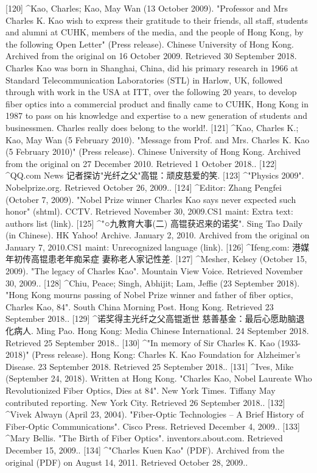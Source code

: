 [120]
^Kao, Charles; Kao, May Wan (13 October 2009). "Professor and Mrs Charles K. Kao wish to express their gratitude to their friends, all staff, students and alumni at CUHK, members of the media, and the people of Hong Kong, by the following Open Letter" (Press release). Chinese University of Hong Kong. Archived from the original on 16 October 2009. Retrieved 30 September 2018. Charles Kao was born in Shanghai, China, did his primary research in 1966 at Standard Telecommunication Laboratories (STL) in Harlow, UK, followed through with work in the USA at ITT, over the following 20 years, to develop fiber optics into a commercial product and finally came to CUHK, Hong Kong in 1987 to pass on his knowledge and expertise to a new generation of students and businessmen. Charles really does belong to the world!.
[121]
^Kao, Charles K.; Kao, May Wan (5 February 2010). "Message from Prof. and Mrs. Charles K. Kao (5 February 2010)" (Press release). Chinese University of Hong Kong. Archived from the original on 27 December 2010. Retrieved 1 October 2018..
[122]
^QQ.com News 记者探访"光纤之父"高锟：顽皮慈爱的笑.
[123]
^"Physics 2009". Nobelprize.org. Retrieved October 26, 2009..
[124]
^Editor: Zhang Pengfei (October 7, 2009). "Nobel Prize winner Charles Kao says never expected such honor" (shtml). CCTV. Retrieved November 30, 2009.CS1 maint: Extra text: authors list (link).
[125]
^"○九教育大事(二) 高锟获迟来的诺奖". Sing Tao Daily (in Chinese). HK Yahoo! Archive. January 2, 2010. Archived from the original on January 7, 2010.CS1 maint: Unrecognized language (link).
[126]
^Ifeng.com: 港媒年初传高锟患老年痴呆症 妻称老人家记性差.
[127]
^Mesher, Kelsey (October 15, 2009). "The legacy of Charles Kao". Mountain View Voice. Retrieved November 30, 2009..
[128]
^Chiu, Peace; Singh, Abhijit; Lam, Jeffie (23 September 2018). "Hong Kong mourns passing of Nobel Prize winner and father of fiber optics, Charles Kao, 84". South China Morning Post. Hong Kong. Retrieved 23 September 2018..
[129]
^诺奖得主光纤之父高锟逝世 慈善基金：最后心愿助脑退化病人. Ming Pao. Hong Kong: Media Chinese International. 24 September 2018. Retrieved 25 September 2018..
[130]
^"In memory of Sir Charles K. Kao (1933-2018)" (Press release). Hong Kong: Charles K. Kao Foundation for Alzheimer’s Disease. 23 September 2018. Retrieved 25 September 2018..
[131]
^Ives, Mike (September 24, 2018). Written at Hong Kong. "Charles Kao, Nobel Laureate Who Revolutionized Fiber Optics, Dies at 84". New York Times. Tiffany May contributed reporting. New York City. Retrieved 26 September 2018..
[132]
^Vivek Alwayn (April 23, 2004). "Fiber-Optic Technologies – A Brief History of Fiber-Optic Communications". Cisco Press. Retrieved December 4, 2009..
[133]
^Mary Bellis. "The Birth of Fiber Optics". inventors.about.com. Retrieved December 15, 2009..
[134]
^"Charles Kuen Kao" (PDF). Archived from the original (PDF) on August 14, 2011. Retrieved October 28, 2009..